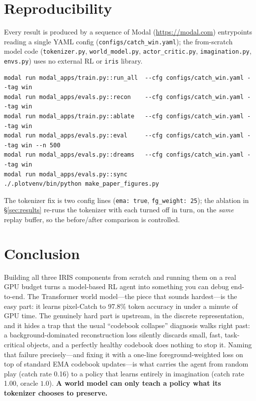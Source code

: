 \documentclass[11pt]{article}
\newcommand{\wmTok}{97.8}
\newcommand{\catchRate}{1.00}
\newcommand{\randCatch}{0.16}
\begin{document}
\section{Reproducibility}
\label{sec:reproduce}
Every result is produced by a sequence of Modal (\url{https://modal.com})
entrypoints reading a
single YAML config (\texttt{configs/catch\_win.yaml}); the from-scratch model
code (\texttt{tokenizer.py}, \texttt{world\_model.py}, \texttt{actor\_critic.py},
\texttt{imagination.py}, \texttt{envs.py}) uses no external RL or \texttt{iris}
library.
\begin{verbatim}
modal run modal_apps/train.py::run_all  --cfg configs/catch_win.yaml --tag win
modal run modal_apps/evals.py::recon    --cfg configs/catch_win.yaml --tag win
modal run modal_apps/train.py::ablate   --cfg configs/catch_win.yaml --tag win
modal run modal_apps/evals.py::eval     --cfg configs/catch_win.yaml --tag win --n 500
modal run modal_apps/evals.py::dreams   --cfg configs/catch_win.yaml --tag win
modal run modal_apps/evals.py::sync
./.plotvenv/bin/python make_paper_figures.py
\end{verbatim}
The tokenizer fix is two config lines (\texttt{ema: true},
\texttt{fg\_weight: 25}); the ablation in \S\ref{sec:results} re-runs the
tokenizer with each turned off in turn, on the \emph{same} replay buffer, so the
before/after comparison is controlled.

\section{Conclusion}
\label{sec:conclusion}
Building all three IRIS components from scratch and running them on a real GPU
budget turns a model-based RL agent into something you can debug end-to-end. The
Transformer world model---the piece that sounds hardest---is the easy part: it
learns pixel-Catch to \wmTok\% token accuracy in under a minute of GPU time. The
genuinely hard part is upstream, in the discrete representation, and it hides a
trap that the usual ``codebook collapse'' diagnosis walks right past: a
background-dominated reconstruction loss silently discards small, fast,
task-critical objects, and a perfectly healthy codebook does nothing to stop it.
Naming that failure precisely---and fixing it with a one-line foreground-weighted
loss on top of standard EMA codebook updates---is what carries the agent from
random play (catch rate \randCatch) to a policy that learns entirely in
imagination (catch rate \catchRate, oracle $1.0$). \textbf{A world model can only
teach a policy what its tokenizer chooses to preserve.}
\end{document}
